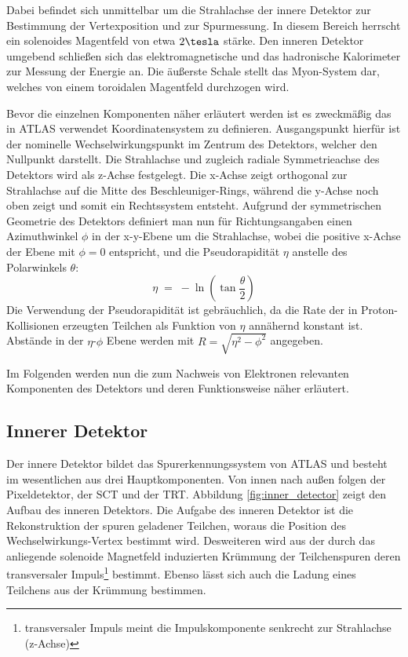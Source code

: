 Dabei befindet sich unmittelbar um die Strahlachse der innere Detektor zur
Bestimmung der Vertexposition und zur Spurmessung. In diesem Bereich herrscht
ein solenoides Magentfeld von etwa $2\tesla$ stärke. Den inneren Detektor
umgebend schließen sich das elektromagnetische und das hadronische Kalorimeter
zur Messung der Energie an. Die äußerste Schale stellt das Myon-System dar,
welches von einem toroidalen Magentfeld durchzogen wird.

Bevor die einzelnen Komponenten näher erläutert werden ist es zweckmäßig das in
ATLAS verwendet Koordinatensystem zu definieren. Ausgangspunkt hierfür ist der
nominelle Wechselwirkungspunkt im Zentrum des Detektors, welcher den Nullpunkt
darstellt. Die Strahlachse und zugleich radiale Symmetrieachse des Detektors
wird als z-Achse festgelegt. Die x-Achse zeigt orthogonal zur Strahlachse auf
die Mitte des Beschleuniger-Rings, während die y-Achse noch oben zeigt und
somit ein Rechtssystem entsteht. Aufgrund der symmetrischen Geometrie des
Detektors definiert man nun für Richtungsangaben einen Azimuthwinkel
$\phi$ in der x-y-Ebene um die Strahlachse, wobei die positive x-Achse der
Ebene mit $\phi=0$ entspricht, und die Pseudorapidität $\eta$ anstelle des
Polarwinkels $\theta$:
\begin{equation}
    \eta \; = \; - \ln \left( \tan\frac{\theta}{2} \right)
\end{equation}
Die Verwendung der Pseudorapidität ist gebräuchlich, da die Rate der in
Proton-Kollisionen erzeugten Teilchen als Funktion von $\eta$ annähernd
konstant ist. Abstände in der $\eta$-$\phi$ Ebene werden mit
$R=\sqrt{\eta^2-\phi^2}$ angegeben.

Im Folgenden werden nun die zum Nachweis von Elektronen relevanten Komponenten
des Detektors und deren Funktionsweise näher erläutert.



\subsection{Innerer Detektor}
\label{inner_detector}

Der innere Detektor bildet das Spurerkennungssystem von ATLAS und besteht im
wesentlichen aus drei Hauptkomponenten. Von innen nach außen folgen der
Pixeldetektor, der \acf{SCT} und der \acf{TRT}. Abbildung
\ref{fig:inner_detector} zeigt den Aufbau des inneren Detektors. Die Aufgabe
des inneren Detektor ist die Rekonstruktion der spuren geladener Teilchen,
woraus die Position des Wechselwirkungs-Vertex bestimmt wird. Desweiteren wird
aus der durch das anliegende solenoide Magnetfeld induzierten Krümmung der
Teilchenspuren deren transversaler Impuls\footnote{transversaler Impuls meint
die Impulskomponente senkrecht zur Strahlachse (z-Achse)} bestimmt. Ebenso
lässt sich auch die Ladung eines Teilchens aus der Krümmung bestimmen.

